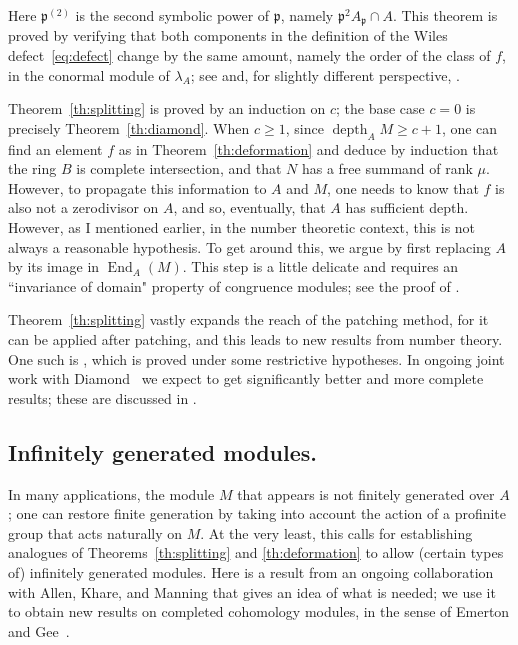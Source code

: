\documentclass[twoside,leqno]{article}
\newcommand{\depth}{\operatorname{depth}}
\newcommand{\End}{\operatorname{End}}
\newcommand{\fp}{{\mathfrak p}}
\begin{document}
Here $\fp^{(2)}$ is the second symbolic power of $\fp$, namely $\fp^2A_\fp\cap A$. This theorem is proved by verifying that both components in the definition of the Wiles defect~\eqref{eq:defect} change by the same amount, namely the order of the class of $f$, in the conormal module of $\lambda_A$; see \cite[\S8]{Iyengar/Khare/Manning:2024a} and, for slightly different perspective, \cite[\S2]{Iyengar/Khare/Manning/Urban:2024}.

Theorem~\ref{th:splitting} is proved by an induction on $c$; the base case $c=0$ is precisely Theorem~\ref{th:diamond}. When $c\ge 1$, since $\depth_AM\ge c+1$, one can find an element $f$ as in Theorem~\ref{th:deformation} and deduce by induction that the ring $B$ is complete intersection, and that $N$ has a free summand of rank $\mu$. However, to propagate this information to $A$ and $M$, one needs to know that $f$ is also not a zerodivisor on $A$, and so, eventually, that $A$ has sufficient depth. However, as I mentioned earlier, in the number theoretic context, this is not always a reasonable hypothesis. To get around this, we argue by first replacing $A$ by its image in $\End_A(M)$. This step is a little delicate and requires an ``invariance of domain" property of congruence modules; see the proof of \cite[Theorem~7.4]{Iyengar/Khare/Manning:2024a}.

Theorem~\ref{th:splitting} vastly expands the reach of the patching method, for it can be applied after patching, and this leads to new results from number theory. One such is \cite[Theorem~F]{Iyengar/Khare/Manning:2024a}, which is proved under some restrictive hypotheses. In ongoing joint work with Diamond~\cite{Diamond/Iyengar/Khare/Manning:2025a} we expect to get significantly better and more complete results; these are discussed in \cite[3.2]{Iyengar/Khare/Manning:2025a}.

\subsection*{Infinitely generated modules.}
 In many applications, the module $M$ that appears is not finitely generated over $A$; one can restore finite generation by taking into account the action of a profinite group that acts naturally on $M$. At the very least, this calls for establishing analogues of Theorems~\ref{th:splitting} and \ref{th:deformation} to allow (certain types of) infinitely generated modules. Here is a result from an ongoing collaboration~\cite{Allen/Iyengar/Khare/Manning:2025a} with Allen, Khare, and Manning that gives an idea of what is needed; we use it to obtain new results on completed cohomology modules, in the sense of Emerton and Gee~\cite{Calegari/Emerton:2012}.
\end{document}
